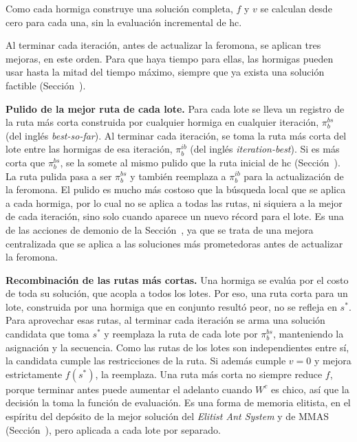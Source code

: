Como cada hormiga construye una solución completa, $f$ y $v$ se calculan
desde cero para cada una, sin la evaluación incremental de \ac{hc}.

\stopsubsection

\startsubsection[title={Mejoras al final de cada iteración}, reference=sec:aco_pulido]

Al terminar cada iteración, antes de actualizar la feromona, se aplican tres
mejoras, en este orden. Para que haya tiempo para ellas, las hormigas pueden
usar hasta la mitad del tiempo máximo, siempre que ya exista una solución
factible (Sección~).

{\bf Pulido de la mejor ruta de cada lote.} Para cada lote se lleva un
registro de la ruta más corta construida por cualquier hormiga en cualquier
iteración, $\pi^{bs}_b$ (del inglés {\em best-so-far}). Al terminar cada
iteración, se toma la ruta más corta del lote entre las hormigas de esa
iteración, $\pi^{ib}_b$ (del inglés {\em iteration-best}). Si es más corta
que $\pi^{bs}_b$, se la somete al mismo pulido que la ruta inicial de
\ac{hc} (Sección~). La ruta pulida pasa a ser
$\pi^{bs}_b$ y también reemplaza a $\pi^{ib}_b$ para la actualización de la
feromona. El pulido es mucho más costoso que la búsqueda local que se aplica
a cada hormiga, por lo cual no se aplica a todas las rutas, ni siquiera a la
mejor de cada iteración, sino solo cuando aparece un nuevo récord para el
lote. Es una de las acciones de demonio de la Sección~, ya
que se trata de una mejora centralizada que se aplica a las soluciones más
prometedoras antes de actualizar la feromona.

{\bf Recombinación de las rutas más cortas.} Una hormiga se evalúa por el
costo de toda su solución, que acopla a todos los lotes. Por eso, una ruta
corta para un lote, construida por una hormiga que en conjunto resultó
peor, no se refleja en $s^*$. Para aprovechar esas rutas, al terminar cada
iteración se arma una solución candidata que toma $s^*$ y reemplaza la ruta
de cada lote por $\pi^{bs}_b$, manteniendo la asignación y la secuencia.
Como las rutas de los lotes son independientes entre sí, la candidata cumple
las restricciones de la ruta. Si además cumple $v = 0$ y mejora estrictamente $f(s^*)$, la reemplaza.
Una ruta más corta no siempre reduce $f$, porque terminar antes puede aumentar el
adelanto cuando $W^{c}$ es chico, así que la decisión la toma la función de
evaluación. Es una forma de memoria elitista, en el espíritu del depósito
de la mejor solución del {\em Elitist Ant System} y de MMAS
(Sección~), pero aplicada a cada lote por separado.

